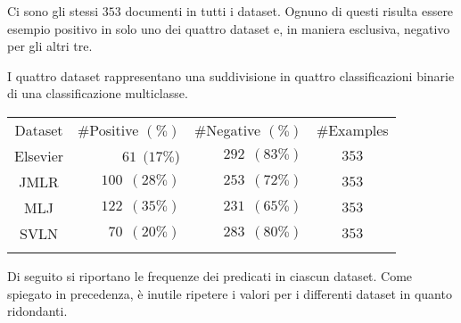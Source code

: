  
Ci sono gli stessi $353$ documenti in tutti i dataset. Ognuno di questi risulta essere esempio positivo in solo uno dei quattro dataset e, in maniera esclusiva, negativo per gli altri tre.

I quattro dataset rappresentano una suddivisione in quattro classificazioni binarie di una classificazione multiclasse.


\begin{table}[htbp]
	\label{tab:datasets}
	\centering
\begin{tabular}{c@{\qquad}r@{\qquad}r@{\qquad}c}
\toprule
\addlinespace
Dataset & \#Positive $(\%)$ & \#Negative $(\%)$ & \#Examples \\
\addlinespace
\midrule
\addlinespace
Elsevier & $61~~(17\%$) & $292~~(83\%)$ & $353$ \\
JMLR     & $100~~(28\%)$ & $253~~(72\%)$ & $353$ \\
MLJ      & $122~~(35\%)$ & $231~~(65\%)$ & $353$ \\
SVLN     & $70~~(20\%)$ & $283~~(80\%)$ & $353$ \\
\addlinespace
\bottomrule
\end{tabular}
\end{table}

Di seguito si riportano le frequenze dei predicati in ciascun dataset. Come spiegato in precedenza, è inutile ripetere i valori per i differenti dataset in quanto ridondanti.

